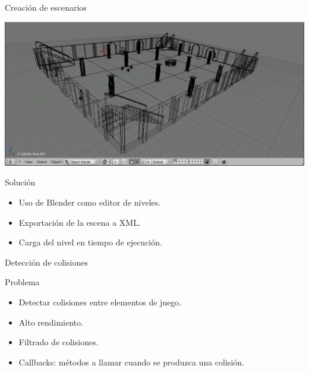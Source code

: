 \documentclass[green]{beamer}
\begin{document}
\begin{frame}{Creación de escenarios}
    
    \begin{center}
	\includegraphics[scale=0.25]{img/blender-5.jpg}
    \end{center}
    
    \begin{block}{Solución}
	\begin{itemize}
	    \item Uso de Blender como editor de niveles.
	    \item Exportación de la escena a XML.
	    \item Carga del nivel en tiempo de ejecución.
	\end{itemize}
    \end{block}
\end{frame}

    
\begin{frame}{Detección de colisiones}
    
    \begin{alertblock}{Problema}
	\begin{itemize}
	    \item Detectar colisiones entre elementos de juego.
	    \item Alto rendimiento.
	    \item Filtrado de colisiones.
	    \item Callbacks: métodos a llamar cuando se produzca una colisión.
	\end{itemize}
    \end{alertblock}
\end{frame}
\end{document}
